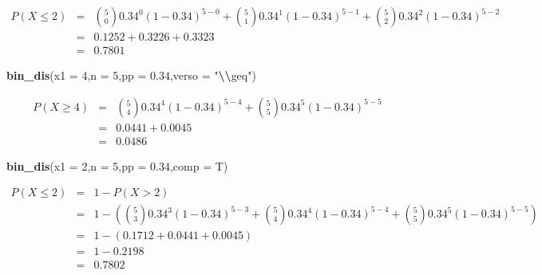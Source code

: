 \documentclass[
  11pt,
]{book}
\newenvironment{Shaded}{\begin{snugshade}}{\end{snugshade}}
\newcommand{\AttributeTok}[1]{\textcolor[rgb]{0.13,0.29,0.53}{#1}}
\newcommand{\DecValTok}[1]{\textcolor[rgb]{0.00,0.00,0.81}{#1}}
\newcommand{\FloatTok}[1]{\textcolor[rgb]{0.00,0.00,0.81}{#1}}
\newcommand{\FunctionTok}[1]{\textcolor[rgb]{0.13,0.29,0.53}{\textbf{#1}}}
\newcommand{\NormalTok}[1]{#1}
\newcommand{\SpecialCharTok}[1]{\textcolor[rgb]{0.81,0.36,0.00}{\textbf{#1}}}
\newcommand{\StringTok}[1]{\textcolor[rgb]{0.31,0.60,0.02}{#1}}
\theoremstyle{mytheoremstyle}
\theoremstyle{mydefstyle}
\begin{document}
\normalsize 
\begin{eqnarray*}
      P( X \leq 2 ) &=& \binom{ 5 }{ 0 } 0.34 ^{ 0 }(1- 0.34 )^{ 5 - 0 }+\binom{ 5 }{ 1 } 0.34 ^{ 1 }(1- 0.34 )^{ 5 - 1 }+\binom{ 5 }{ 2 } 0.34 ^{ 2 }(1- 0.34 )^{ 5 - 2 } \\                 &=& 0.1252+0.3226+0.3323 \\                 &=& 0.7801 
   \end{eqnarray*}
\normalsize 

\begin{Shaded}
\begin{Highlighting}[]
\FunctionTok{bin\_dis}\NormalTok{(}\AttributeTok{x1 =} \DecValTok{4}\NormalTok{,}\AttributeTok{n =} \DecValTok{5}\NormalTok{,}\AttributeTok{pp =} \FloatTok{0.34}\NormalTok{,}\AttributeTok{verso =} \StringTok{"}\SpecialCharTok{\textbackslash{}\textbackslash{}}\StringTok{geq"}\NormalTok{)}
\end{Highlighting}
\end{Shaded}

\normalsize 
\begin{eqnarray*}
      P( X \geq 4 ) &=& \binom{ 5 }{ 4 } 0.34 ^{ 4 }(1- 0.34 )^{ 5 - 4 }+\binom{ 5 }{ 5 } 0.34 ^{ 5 }(1- 0.34 )^{ 5 - 5 } \\                 &=& 0.0441+0.0045 \\                 &=& 0.0486 
   \end{eqnarray*}
\normalsize 

\begin{Shaded}
\begin{Highlighting}[]
\FunctionTok{bin\_dis}\NormalTok{(}\AttributeTok{x1 =} \DecValTok{2}\NormalTok{,}\AttributeTok{n =} \DecValTok{5}\NormalTok{,}\AttributeTok{pp =} \FloatTok{0.34}\NormalTok{,}\AttributeTok{comp =}\NormalTok{ T)}
\end{Highlighting}
\end{Shaded}

\normalsize 
\begin{eqnarray*}
      P( X \leq 2 ) &=& 1-P( X > 2 ) \\                 &=& 1-\left( \binom{ 5 }{ 3 } 0.34 ^{ 3 }(1- 0.34 )^{ 5 - 3 }+\binom{ 5 }{ 4 } 0.34 ^{ 4 }(1- 0.34 )^{ 5 - 4 }+\binom{ 5 }{ 5 } 0.34 ^{ 5 }(1- 0.34 )^{ 5 - 5 } \right)\\                 &=& 1-( 0.1712+0.0441+0.0045 )\\                 &=& 1- 0.2198 \\                 &=&   0.7802 
   \end{eqnarray*}
\normalsize 
\end{document}
